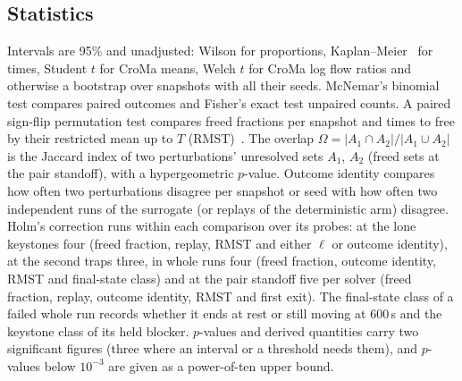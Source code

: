 \subsection{Statistics}\label{sec:stats}
Intervals are 95\% and unadjusted: Wilson for proportions, Kaplan--Meier~\cite{kaplanmeier1958} for times, Student $t$ for CroMa means, Welch $t$ for CroMa log flow ratios and otherwise a bootstrap over snapshots with all their seeds. McNemar's binomial test compares paired outcomes and Fisher's exact test unpaired counts. A paired sign-flip permutation test compares freed fractions per snapshot and times to free by their restricted mean up to $T$ (RMST)~\cite{royston2013}. The overlap $\Omega=|A_1\cap A_2|/|A_1\cup A_2|$ is the Jaccard index of two perturbations' unresolved sets $A_1$, $A_2$ (freed sets at the pair standoff), with a hypergeometric $p$-value. Outcome identity compares how often two perturbations disagree per snapshot or seed with how often two independent runs of the surrogate (or replays of the deterministic arm) disagree. Holm's correction runs within each comparison over its probes:%
{} at the lone keystones four (freed fraction, replay, RMST and either $\ell$ or outcome identity), at the second traps three, in whole runs four (freed fraction, outcome identity, RMST and final-state class) and at the pair standoff five per solver (freed fraction, replay, outcome identity, RMST and first exit). The final-state class of a failed whole run records whether it ends at rest or still moving at 600\,s and the keystone class of its held blocker. $p$-values and derived quantities carry two significant figures (three where an interval or a threshold needs them), and $p$-values below $10^{-3}$ are given as a power-of-ten upper bound.
